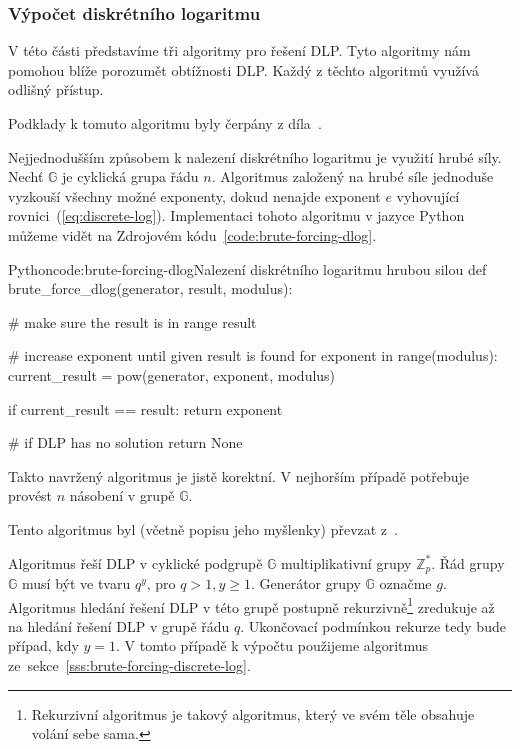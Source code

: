 \documentclass[
  program=infoi,
  biblatex=false,
  figures=true,
  glossaries,
  tables=false,
  sourcecodes=true,
  index
]{kidiplom}
\begin{document}
    \subsubsection{Výpočet diskrétního logaritmu}\label{ss:computing-discrete-log}

        V této části představíme tři algoritmy pro řešení DLP.
        Tyto algoritmy nám pomohou blíže porozumět obtížnosti DLP.
        Každý z těchto algoritmů využívá odlišný přístup.

        \label{sss:brute-forcing-discrete-log}

            Podklady k tomuto algoritmu byly čerpány z díla~\cite{computational-introduction}.

            Nejjednodušším způsobem k nalezení diskrétního logaritmu je využití hrubé síly.
            Nechť $\mathbb{G}$ je cyklická grupa řádu $n$.
            Algoritmus založený na hrubé síle jednoduše vyzkouší všechny možné exponenty,
            dokud nenajde exponent $e$ vyhovující rovnici~(\ref{eq:discrete-log}).
            Implementaci tohoto algoritmu v jazyce Python můžeme vidět na Zdrojovém kódu~\ref{code:brute-forcing-dlog}.
            
\begin{kicode}{Python}{code:brute-forcing-dlog}{Nalezení diskrétního logaritmu hrubou silou}
def brute_force_dlog(generator, result, modulus):

    # make sure the result is in range
    result %

    # increase exponent until given result is found
    for exponent in range(modulus):
        current_result = pow(generator, exponent, modulus)

        if current_result == result:
            return exponent

    # if DLP has no solution
    return None
\end{kicode}

            Takto navržený algoritmus je jistě korektní.
            V nejhorším případě potřebuje provést $n$ násobení v grupě $\mathbb{G}$.


        \label{sss:recursive-discrete-log}

            Tento algoritmus byl (včetně popisu jeho myšlenky) převzat z~\cite{computational-introduction}.

            Algoritmus řeší DLP v cyklické podgrupě $\mathbb{G}$ multiplikativní grupy $\mathbb{Z}^*_p$.
            Řád grupy $\mathbb{G}$ musí být ve tvaru $q^y$, pro $q > 1, y \geq 1$.
            Generátor grupy $\mathbb{G}$ označme $g$.
            Algoritmus hledání řešení DLP v této grupě postupně rekurzivně\footnote{Rekurzivní algoritmus je takový algoritmus, který
            ve svém těle obsahuje volání sebe sama.}
            zredukuje až na hledání řešení DLP v grupě řádu $q$.
            Ukončovací podmínkou rekurze tedy bude případ, kdy $y = 1$.
            V tomto případě k výpočtu použijeme algoritmus ze~sekce~\ref{sss:brute-forcing-discrete-log}.
\end{document}
